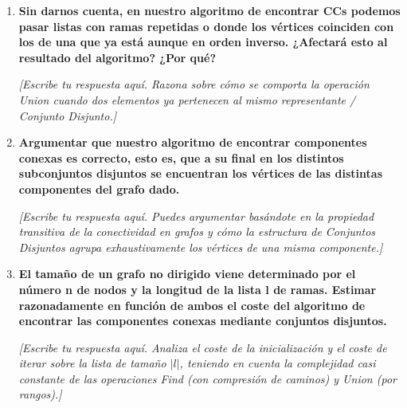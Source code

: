 \documentclass[11pt, a4paper]{article}
\begin{document}
\begin{enumerate}
    \item \textbf{Sin darnos cuenta, en nuestro algoritmo de encontrar CCs podemos pasar listas con ramas repetidas o donde los vértices coinciden con los de una que ya está aunque en orden inverso. ¿Afectará esto al resultado del algoritmo? ¿Por qué?}
    
    \textit{[Escribe tu respuesta aquí. Razona sobre cómo se comporta la operación Union cuando dos elementos ya pertenecen al mismo representante / Conjunto Disjunto.]}
    
    \vspace{2em}

    \item \textbf{Argumentar que nuestro algoritmo de encontrar componentes conexas es correcto, esto es, que a su final en los distintos subconjuntos disjuntos se encuentran los vértices de las distintas componentes del grafo dado.}
    
    \textit{[Escribe tu respuesta aquí. Puedes argumentar basándote en la propiedad transitiva de la conectividad en grafos y cómo la estructura de Conjuntos Disjuntos agrupa exhaustivamente los vértices de una misma componente.]}
    
    \vspace{2em}

    \item \textbf{El tamaño de un grafo no dirigido viene determinado por el número n de nodos y la longitud de la lista l de ramas. Estimar razonadamente en función de ambos el coste del algoritmo de encontrar las componentes conexas mediante conjuntos disjuntos.}
    
    \textit{[Escribe tu respuesta aquí. Analiza el coste de la inicialización y el coste de iterar sobre la lista de tamaño $|l|$, teniendo en cuenta la complejidad casi constante de las operaciones Find (con compresión de caminos) y Union (por rangos).]}

\end{enumerate}
\end{document}
